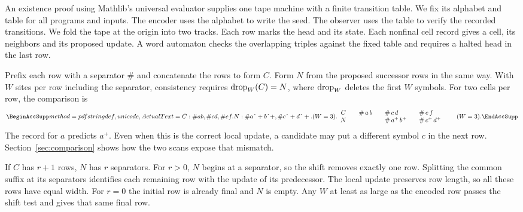 \label{sec:history}
An existence proof using Mathlib's universal evaluator supplies one tape machine with a finite transition table. We fix its alphabet and table for all programs and inputs. The encoder uses the alphabet to write the seed. The observer uses the table to verify the recorded transitions. We fold the tape at the origin into two tracks. Each row marks the head and its state. Each nonfinal cell record gives a cell, its neighbors and its proposed update. A word automaton checks the overlapping triples against the fixed table and requires a halted head in the last row.

Prefix each row with a separator $\#$ and concatenate the rows to form $C$. Form $N$ from the proposed successor rows in the same way. With $W$ sites per row including the separator, consistency requires $\operatorname{drop}_W(C)=N$, where $\operatorname{drop}_W$ deletes the first $W$ symbols. For two cells per row, the comparison is
\[
\mathcopy{C: \# a b, \# c d, \# e f. N: \# a\string^+ b\string^+, \# c\string^+ d\string^+. (W = 3).}{%
\begin{array}{c@{\qquad}l@{\qquad}l@{\qquad}l}
 C & \#\,a\,b & \#\,c\,d & \#\,e\,f \\
 N &            & \#\,a^+\,b^+ & \#\,c^+\,d^+
\end{array}\qquad (W=3).}
\]
The record for $a$ predicts $a^+$. Even when this is the correct local update, a candidate may put a different symbol $c$ in the next row. Section~\ref{sec:comparison} shows how the two scans expose that mismatch.

If $C$ has $r+1$ rows, $N$ has $r$ separators. For $r>0$, $N$ begins at a separator, so the shift removes exactly one row. Splitting the common suffix at its separators identifies each remaining row with the update of its predecessor. The local update preserves row length, so all these rows have equal width. For $r=0$ the initial row is already final and $N$ is empty. Any $W$ at least as large as the encoded row passes the shift test and gives that same final row.

